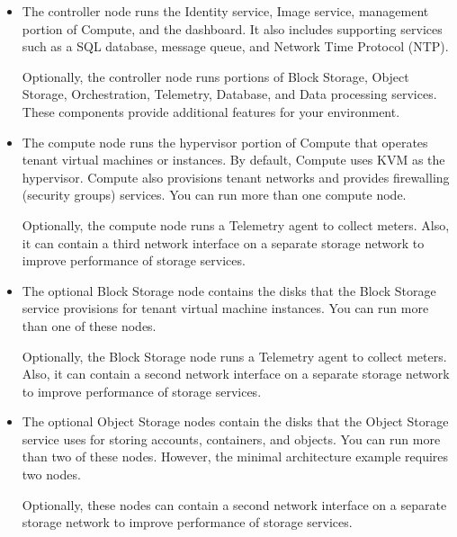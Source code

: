     \begin{itemize}
        \item The controller node runs the Identity service, Image service, management portion of Compute, and the dashboard. It also includes supporting services such as a SQL database, message queue, and Network Time Protocol (NTP).
        \par Optionally, the controller node runs portions of Block Storage, Object Storage, Orchestration, Telemetry, Database, and Data processing services. These components provide additional features for your environment.
        
        \item The compute node runs the hypervisor portion of Compute that operates tenant virtual machines or instances. By default, Compute uses KVM as the hypervisor. Compute also provisions tenant networks and provides firewalling (security groups) services. You can run more than one compute node.
        \par Optionally, the compute node runs a Telemetry agent to collect meters. Also, it can contain a third network interface on a separate storage network to improve performance of storage services.
        
        \item The optional Block Storage node contains the disks that the Block Storage service provisions for tenant virtual machine instances. You can run more than one of these nodes.
        \par Optionally, the Block Storage node runs a Telemetry agent to collect meters. Also, it can contain a second network interface on a separate storage network to improve performance of storage services.
        
        \item The optional Object Storage nodes contain the disks that the Object Storage service uses for storing accounts, containers, and objects. You can run more than two of these nodes. However, the minimal architecture example requires two nodes.
        \par Optionally, these nodes can contain a second network interface on a separate storage network to improve performance of storage services.
    \end{itemize}
    
